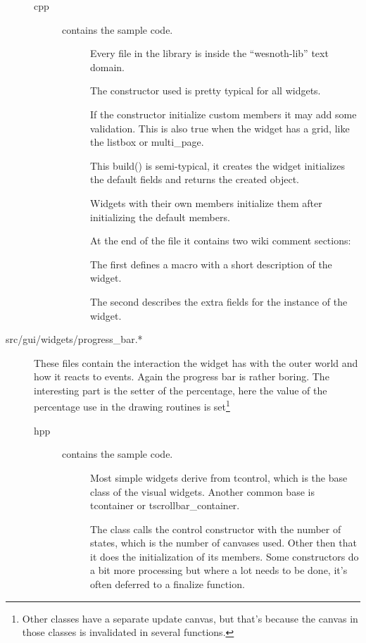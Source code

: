 \begin{description}
\begin{description}
\item[cpp]  contains the sample code. 
	\begin{description}
	\item[] Every file in the library
		is inside the ``wesnoth-lib'' text domain.
	\item[] The constructor used is
		pretty typical for all widgets.

		If the constructor initialize custom members it may add some validation.
		This is also true when the widget has a grid, like the listbox or
		multi\_page.
	\item[]
		This build() is semi-typical, it creates the widget initializes the
		default fields and returns the created object.

		Widgets with their own members initialize them after initializing the
		default members.
	\item[]
		At the end of the file it contains two wiki comment sections:

		The first defines a macro with a short description of the widget.

		The second describes the extra fields for the instance of the widget.
	\end{description}
\end{description}

\item[src/gui/widgets/progress\_bar.*]
	These files contain the interaction the widget has with the outer world and
	how it reacts to events. Again the progress bar is rather boring. The
	interesting part is the setter of the percentage, here the value of the
	percentage use in the drawing routines is set\footnote{Other classes have a
	separate update canvas, but that's because the canvas in those classes is
	invalidated in several functions.}

\begin{description}
\item[hpp]  contains the sample code. 
	\begin{description}
	\item[]
		Most simple widgets derive from tcontrol, which is the base class of the
		visual widgets. Another common base is tcontainer or
		tscrollbar\_container.

	\item[]
		The class calls the control constructor with the number of states, which
		is the number of canvases used. Other then that it does the
		initialization of its members. Some constructors do a bit more
		processing but where a lot needs to be done, it's often deferred to a
		finalize function.	


\end{description}
\end{description}
\end{description}
